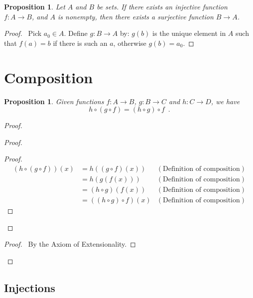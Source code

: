 \documentclass{book}
\let\qed\relax
\newtheorem{prop}[ax]{Proposition}
\theoremstyle{definition}
\begin{document}
\begin{prop}
Let $A$ and $B$ be sets. If there exists an injective function $f : A \rightarrow B$, and $A$ is nonempty, then there exists a surjective function $B \rightarrow A$.
\end{prop}

\begin{proof}
\pf\ Pick $a_0 \in A$. Define $g : B \rightarrow A$ by: $g(b)$ is the unique element in $A$ such that $f(a) = b$ if there is such an $a$, otherwise $g(b) = a_0$. \qed
\end{proof}

\section{Composition}

\begin{prop}
Given functions $f : A \rightarrow B$, $g : B \rightarrow C$ and $h : C \rightarrow D$, we have
\[ h \circ (g \circ f) = (h \circ g) \circ f \enspace . \]
\end{prop}

\begin{proof}
\pf
{}
\begin{proof}
	\begin{proof}
		\pf
		\begin{align*}
			(h \circ (g \circ f))(x)
			& = h ((g \circ f)(x)) & (\text{Definition of composition}) \\
			& = h(g(f(x))) & (\text{Definition of composition}) \\
			& = (h \circ g)(f(x)) & (\text{Definition of composition}) \\
			& = ((h \circ g) \circ f)(x) & (\text{Definition of composition})
		\end{align*}
	\end{proof}
\end{proof}
\qedstep
\begin{proof}
	\pf\ By the Axiom of Extensionality.
\end{proof}
\qed
\end{proof}

\subsection{Injections} %
\end{document}
